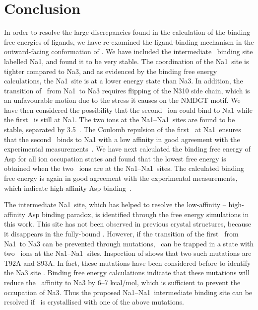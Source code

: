 \section{Conclusion}
In order to resolve the large discrepancies found in the calculation of the binding free energies of 
ligands, we have re-examined the ligand-binding mechanism in the outward-facing conformation of \GltPh. 
We have included the intermediate \Na\ binding site labelled Na1\prim, and found it to be very stable. 
The coordination of the Na1\prim\ site is tighter compared to Na3, and as evidenced by the binding free
energy calculations, the Na1\prim\ site is at a lower energy state than Na3. In addition, the transition 
of \Na\ from Na1\prim\ to Na3 requires flipping of the N310 side chain, which is an unfavourable motion 
due to the stress it causes on the NMDGT motif. We have then considered the possibility that the second 
\Na\ ion could bind to Na1 while the first \Na\ is still at Na1\prim. The two ions at the Na1--Na1\prim\ 
sites are found to be stable, separated by 3.5~\angs. The Coulomb repulsion of the first \Na\ at Na1\prim\ 
ensures that the second \Na\ binds to Na1 with a low affinity in good agreement with the experimental 
measurements~\cite{Reyes2013b,Ewers2013,Hanelt2015}. We have next calculated the binding free energy of 
Asp for all ion occupation states and found that the lowest free energy is obtained when the two \Na\ ions 
are at the Na1--Na1\prim\ sites. The calculated binding free energy is again in good agreement with the 
experimental measurements, which indicate high-affinity Asp binding~\cite{Hanelt2015,Ewers2013}. 

The intermediate Na1\prim\ site, which has helped to resolve the low-affinity \Na -- high-affinity Asp 
binding paradox, is identified through the free energy simulations in this work. This site has not been
observed in previous crystal structures, because it disappears in the fully-bound \GltPh. However, if 
the transition of the first \Na\ from Na1\prim\ to Na3 can be prevented through mutations, \GltPh\ can 
be trapped in a state with two \Na\ ions at the Na1--Na1\prim\ sites. Inspection of \tabref{bind:tab1} 
shows that two such mutations are T92A and S93A. In fact, these mutations have been considered before 
to identify the Na3 site \cite{Bastug2012}. Binding free energy calculations indicate that these 
mutations will reduce the \Na\ affinity to Na3 by 6--7 kcal/mol, which is sufficient to prevent the 
occupation of Na3. Thus the proposed Na1--Na1\prim\ intermediate binding site can be resolved if \GltPh\ 
is crystallised with one of the above mutations.

